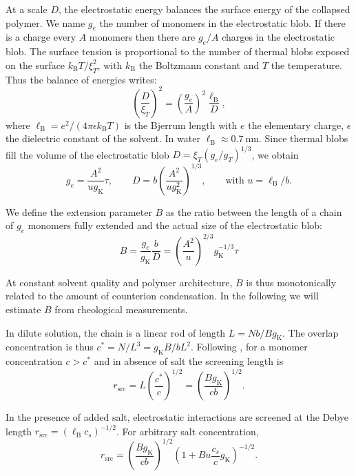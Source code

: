\documentclass[journal=jacsat,manuscript=article]{achemso}
\begin{document}
At a scale $D$, the electrostatic energy balances the surface energy of the collapsed polymer. We name $g_e$ the number of monomers in the electrostatic blob. If there is a charge every $A$ monomers then there are $g_e/A$ charges in the electrostatic blob. The surface tension is proportional to the number of thermal blobs exposed on the surface $k_\mathrm{B}T/\xi_T^2$, with $k_\mathrm{B}$ the Boltzmann constant and $T$ the temperature. Thus the balance of energies writes:
\begin{equation}\left(\frac{D}{\xi_T}\right)^2 = \left(\frac{g_e}{A}\right)^2 \frac{\ell_\mathrm{B}}{D},
\label{eq:electrosurface}
\end{equation}
where $\ell_\mathrm{B} = e^2/(4\pi\epsilon k_\mathrm{B}T)$ is the Bjerrum length with $e$ the elementary charge, $\epsilon$ the dielectric constant of the solvent. In water $\ell_\mathrm{B} \approx \SI{0.7}{\nano\metre}$. Since thermal blobs fill the volume of the electrostatic blob $D = \xi_T \left(g_e/g_T\right)^{1/3}$, we obtain
\begin{equation}
g_e = \frac{A^2}{u g_\mathrm{K}} \tau, \qquad D = b\left(\frac{A^2}{u g_\mathrm{K}^2}\right)^{1/3},\qquad \text{with }u = \ell_\mathrm{B}/b.
\label{eq:geD}
\end{equation}

We define the extension parameter $B$ as the ratio between the length of a chain of $g_e$ monomers fully extended and the actual size of the electrostatic blob: 
\begin{equation}
B = \frac{g_e}{g_\mathrm{K}}\frac{b}{D} = \left(\frac{A^2}{u}\right)^{2/3} g_\mathrm{K}^{-1/3}\tau
\label{eq:B}
\end{equation}

At constant solvent quality and polymer architecture, $B$ is thus monotonically related to the amount of counterion condensation. In the following we will estimate $B$ from rheological measurements.


In dilute solution, the chain is a linear rod of length $L= N b / B g_\mathrm{K}$. The overlap concentration is thus $c^* = N/L^3 = g_\mathrm{K}B / b L^2$. Following \cite{Dobrynin1995}, for a monomer concentration $c > c^*$ and in absence of salt the screening length is
\begin{equation}
r_\mathrm{src} = L \left(\frac{c^*}{c}\right)^{1/2} =  \left(\frac{B g_\mathrm{K}}{cb}\right)^{1/2}.
\label{eq:rscrNoSalt}
\end{equation}

In the presence of added salt, electrostatic interactions are screened at the Debye length $r_\mathrm{src} = \left(\ell_\mathrm{B} c_s\right)^{-1/2}$. For arbitrary salt concentration,
\begin{equation}
r_\mathrm{src} = \left(\frac{B g_\mathrm{K}}{cb}\right)^{1/2} \left(1+ B u \frac{c_s}{c} g_\mathrm{K}\right)^{-1/2}.
\label{eq:rscr}
\end{equation}
\end{document}
